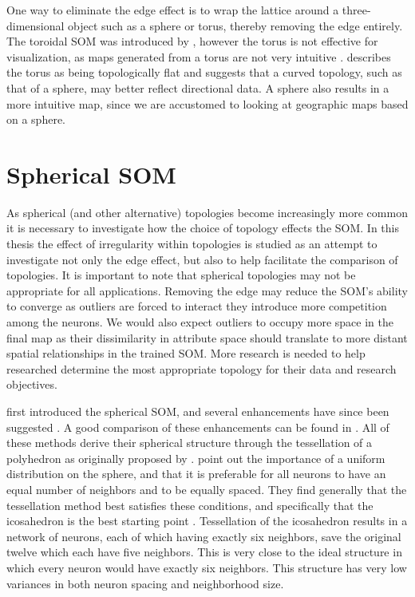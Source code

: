 One way to eliminate the edge effect is to wrap the lattice around a
three-dimensional object such as a sphere or torus, thereby removing the edge
entirely. The toroidal SOM was introduced by \cite{li1993}, however the torus
is not effective for visualization, as maps generated from a torus are not
very intuitive \citep{ito2000,wu2006}.  \cite{ritter99} describes the torus as
being topologically flat and suggests that a curved topology, such as that of
a sphere, may better reflect directional data.  A sphere also results in a
more intuitive map, since we are accustomed to looking at geographic maps
based on a sphere.  

\section{Spherical SOM}
As spherical (and other alternative) topologies become
increasingly more common it is necessary to investigate how the choice of
topology effects the SOM.  In this thesis the effect of irregularity within
topologies is studied as an attempt to investigate not only the edge effect,
but also to help facilitate the comparison of topologies.  It is important to
note that spherical topologies may not be appropriate for all applications.
Removing the edge may reduce the SOM's ability to converge as outliers are
forced to interact they introduce more competition among the neurons.  We
would also expect outliers to occupy more space in the final map as their
dissimilarity in attribute space should translate to more distant spatial
relationships in the trained SOM.  More research is needed to help researched
determine the most appropriate topology for their data and research objectives.

\cite{ritter99} first introduced the spherical SOM, and several enhancements have
since been suggested \citep{boudjemai2003,sangole03,Nishio:2006fk,wu2006}.  A
good comparison of these enhancements can be found in \cite{wu2006}.  All of
these methods derive their spherical structure through the tessellation of a
polyhedron as originally proposed by \cite{ritter99}.  \cite{wu2006} point
out the importance of a uniform distribution on the sphere, and that it is
preferable for all neurons to have an equal number of neighbors and to be
equally spaced.  They find generally that the tessellation method best satisfies
these conditions, and specifically that the icosahedron is the best starting
point \citep{wu2005}. Tessellation of the icosahedron results in a network of
neurons, each of which having exactly six neighbors, save the original twelve
which each have five neighbors.  This is very close to the ideal structure in which every
neuron would have exactly six neighbors.  This structure has very low variances
in both neuron spacing and neighborhood size. 

